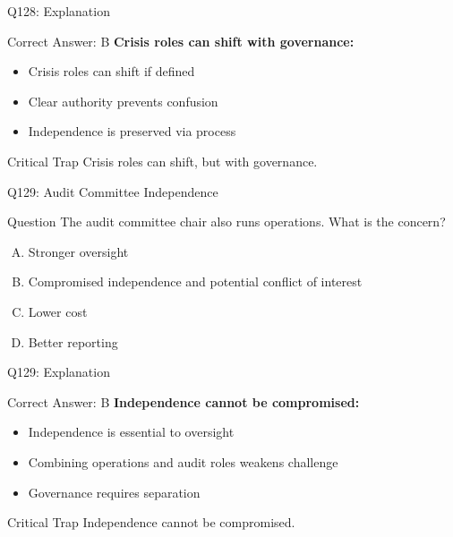 \documentclass{beamer}
\begin{document}
	\begin{frame}{Q128: Explanation}
		\begin{block}{Correct Answer: B}
			\textbf{Crisis roles can shift with governance:}
			\begin{itemize}
				\item Crisis roles can shift if defined
				\item Clear authority prevents confusion
				\item Independence is preserved via process
			\end{itemize}
		\end{block}
		\begin{alertblock}{Critical Trap}
			Crisis roles can shift, but with governance.
		\end{alertblock}
	\end{frame}
	
	\begin{frame}{Q129: Audit Committee Independence}
		\begin{block}{Question}
			The audit committee chair also runs operations. What is the concern?
		\end{block}
		\begin{enumerate}[(A)]
			\item Stronger oversight
			\item Compromised independence and potential conflict of interest
			\item Lower cost
			\item Better reporting
		\end{enumerate}
	\end{frame}
	
	\begin{frame}{Q129: Explanation}
		\begin{block}{Correct Answer: B}
			\textbf{Independence cannot be compromised:}
			\begin{itemize}
				\item Independence is essential to oversight
				\item Combining operations and audit roles weakens challenge
				\item Governance requires separation
			\end{itemize}
		\end{block}
		\begin{alertblock}{Critical Trap}
			Independence cannot be compromised.
		\end{alertblock}
	\end{frame}
	
\end{document}
